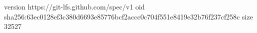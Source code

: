 version https://git-lfs.github.com/spec/v1
oid sha256:63ec0128ef3c380d6693e85776bcf2accc0c704f551e8419e32b76f237cf258c
size 32527
